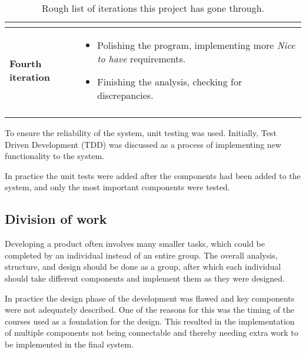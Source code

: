 \begin{longtable}{p{3.2cm} p{10cm}}
\begin{itemize}
        \end{itemize}
        \\
        \hline
        
        \textbf{Fourth iteration} & 
        \vspace*{-7mm}
        \begin{itemize} \itemsep0em 
        
            \item Polishing the program, implementing more \textit{Nice to have} requirements.
            
            \item Finishing the analysis, checking for discrepancies.
            
        \end{itemize}
        \\
        \hline
    \caption{Rough list of iterations this project has gone through.}
    \label{tab:iterations}
   
\end{longtable}

To ensure the reliability of the system, unit testing was used. Initially, Test Driven Development (TDD) was discussed as a process of implementing new functionality to the system. \citep{TDD}
\par
In practice the unit tests were added after the components had been added to the system, and only the most important components were tested.


\subsection{Division of work}
Developing a product often involves many smaller tasks, which could be completed by an individual instead of an entire group. The overall analysis, structure, and design should be done as a group, after which each individual should take different components and implement them as they were designed.
\par
In practice the design phase of the development was flawed and key components were not adequately described. One of the reasons for this was the timing of the courses used as a foundation for the design. This resulted in the implementation of multiple components not being connectable and thereby needing extra work to be implemented in the final system. 

